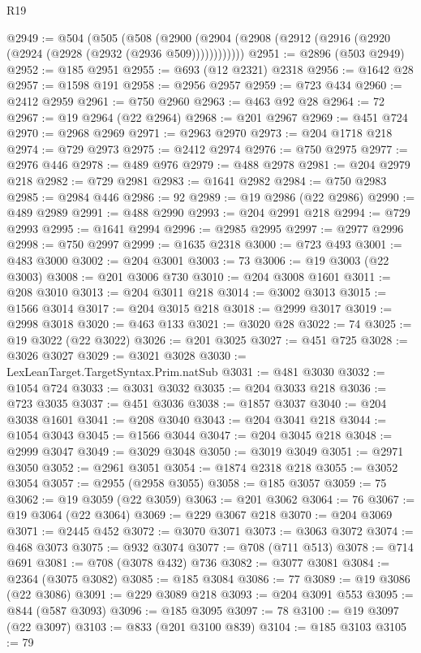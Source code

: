 \begin{lexlean}{R19}
\begin{coremodule}
{{{{{{{{{{{@2949 := @504
    (@505
      (@508 (@2900 (@2904 (@2908 (@2912 (@2916 (@2920 (@2924 (@2928 (@2932 (@2936 @509))))))))))))
@2951 := @2896 (@503 @2949)
@2952 := @185 @2951
@2955 := @693 (@12 @2321) @2318
@2956 := @1642 @28
@2957 := @1598 @191
@2958 := @2956 @2957
@2959 := @723 @434
@2960 := @2412 @2959
@2961 := @750 @2960
@2963 := @463 @92 @28
@2964 := 72
@2967 := @19 @2964 (@22 @2964)
@2968 := @201 @2967
@2969 := @451 @724
@2970 := @2968 @2969
@2971 := @2963 @2970
@2973 := @204 @1718 @218
@2974 := @729 @2973
@2975 := @2412 @2974
@2976 := @750 @2975
@2977 := @2976 @446
@2978 := @489 @976
@2979 := @488 @2978
@2981 := @204 @2979 @218
@2982 := @729 @2981
@2983 := @1641 @2982
@2984 := @750 @2983
@2985 := @2984 @446
@2986 := 92
@2989 := @19 @2986 (@22 @2986)
@2990 := @489 @2989
@2991 := @488 @2990
@2993 := @204 @2991 @218
@2994 := @729 @2993
@2995 := @1641 @2994
@2996 := @2985 @2995
@2997 := @2977 @2996
@2998 := @750 @2997
@2999 := @1635 @2318
@3000 := @723 @493
@3001 := @483 @3000
@3002 := @204 @3001
@3003 := 73
@3006 := @19 @3003 (@22 @3003)
@3008 := @201 @3006 @730
@3010 := @204 @3008 @1601
@3011 := @208 @3010
@3013 := @204 @3011 @218
@3014 := @3002 @3013
@3015 := @1566 @3014
@3017 := @204 @3015 @218
@3018 := @2999 @3017
@3019 := @2998 @3018
@3020 := @463 @133
@3021 := @3020 @28
@3022 := 74
@3025 := @19 @3022 (@22 @3022)
@3026 := @201 @3025
@3027 := @451 @725
@3028 := @3026 @3027
@3029 := @3021 @3028
@3030 := LexLeanTarget.TargetSyntax.Prim.natSub
@3031 := @481 @3030
@3032 := @1054 @724
@3033 := @3031 @3032
@3035 := @204 @3033 @218
@3036 := @723 @3035
@3037 := @451 @3036
@3038 := @1857 @3037
@3040 := @204 @3038 @1601
@3041 := @208 @3040
@3043 := @204 @3041 @218
@3044 := @1054 @3043
@3045 := @1566 @3044
@3047 := @204 @3045 @218
@3048 := @2999 @3047
@3049 := @3029 @3048
@3050 := @3019 @3049
@3051 := @2971 @3050
@3052 := @2961 @3051
@3054 := @1874 @2318 @218
@3055 := @3052 @3054
@3057 := @2955 (@2958 @3055)
@3058 := @185 @3057
@3059 := 75
@3062 := @19 @3059 (@22 @3059)
@3063 := @201 @3062
@3064 := 76
@3067 := @19 @3064 (@22 @3064)
@3069 := @229 @3067 @218
@3070 := @204 @3069
@3071 := @2445 @452
@3072 := @3070 @3071
@3073 := @3063 @3072
@3074 := @468 @3073
@3075 := @932 @3074
@3077 := @708 (@711 @513)
@3078 := @714 @691
@3081 := @708 (@3078 @432) @736
@3082 := @3077 @3081
@3084 := @2364 (@3075 @3082)
@3085 := @185 @3084
@3086 := 77
@3089 := @19 @3086 (@22 @3086)
@3091 := @229 @3089 @218
@3093 := @204 @3091 @553
@3095 := @844 (@587 @3093)
@3096 := @185 @3095
@3097 := 78
@3100 := @19 @3097 (@22 @3097)
@3103 := @833 (@201 @3100 @839)
@3104 := @185 @3103
@3105 := 79
}}}}}}}}}}}
\end{coremodule}
\end{lexlean}
